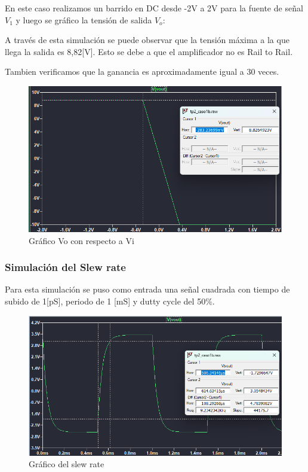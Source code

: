 En este caso realizamos un barrido en DC desde -2V a 2V para la fuente de señal $V_1$ y luego se gráfico la tensión de salida $V_o$:

A través de esta simulación se puede observar que la tensión máxima a la que llega la salida es 8,82[V]. Esto se debe a que el amplificador no es Rail to Rail. 

Tambien verificamos que la ganancia es aproximadamente igual a 30 veces.

\begin{figure}[h!]
    \centering
    \includegraphics[width=0.80\linewidth]{img/vo_vi.png}
    \caption{Gráfico Vo con respecto a Vi}
    \label{fig:vo_vi}
\end{figure}

\vspace{1em}

\subsubsection{Simulación del Slew rate }

Para esta simulación se puso como entrada una señal cuadrada con tiempo de subido de 1[pS], periodo de 1 [mS] y dutty cycle del 50\%. 

\begin{figure}[h!]
    \centering
    \includegraphics[width=0.90\linewidth]{img/slew_rate.png}
    \caption{Gráfico del slew rate}
    \label{fig:1b_slew_rate}
\end{figure}


